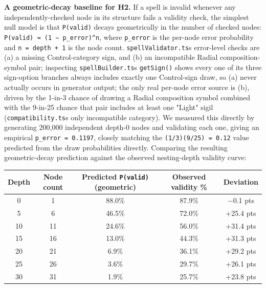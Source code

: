 \documentclass[
  10pt,
  twocolumn]{article}
\begin{document}
\textbf{A geometric-decay baseline for H2.} If a spell is invalid
whenever any independently-checked node in its structure fails a
validity check, the simplest null model is that \texttt{P(valid)} decays
geometrically in the number of checked nodes:
\texttt{P(valid)\ ≈\ (1\ −\ p\_error)\^{}n}, where \texttt{p\_error} is
the per-node error probability and \texttt{n\ =\ depth\ +\ 1} is the
node count. \texttt{spellValidator.ts}\textquotesingle s error-level
checks are (a) a missing Control-category sign, and (b) an incompatible
Radial composition-symbol pair; inspecting
\texttt{spellBuilder.ts}\textquotesingle s \texttt{getSign()} shows
every one of its three sign-option branches always includes exactly one
Control-sign draw, so (a) never actually occurs in generator output; the
only real per-node error source is (b), driven by the 1-in-3 chance of
drawing a Radial composition symbol combined with the 9-in-25 chance
that pair includes at least one "Light" sigil
(\texttt{compatibility.ts}\textquotesingle s only incompatible
category). We measured this directly by generating 200,000 independent
depth-0 nodes and validating each one, giving an empirical
\texttt{p\_error\ =\ 0.1197}, closely matching the
\texttt{(1/3)(9/25)\ =\ 0.12} value predicted from the draw
probabilities directly. Comparing the resulting geometric-decay
prediction against the observed nesting-depth validity curve:

\begin{table}[t]
\centering
\begin{tabular}{@{}ccccc@{}}
\toprule
Depth & Node count & Predicted \texttt{P(valid)} (geometric) & Observed
validity \% & Deviation \\
\midrule
0 & 1 & 88.0\% & 87.9\% & −0.1 pts \\
5 & 6 & 46.5\% & 72.0\% & +25.4 pts \\
10 & 11 & 24.6\% & 56.0\% & +31.4 pts \\
15 & 16 & 13.0\% & 44.3\% & +31.3 pts \\
20 & 21 & 6.9\% & 36.1\% & +29.2 pts \\
25 & 26 & 3.6\% & 29.7\% & +26.1 pts \\
30 & 31 & 1.9\% & 25.7\% & +23.8 pts \\
\bottomrule
\end{tabular}
\end{table}
\end{document}
